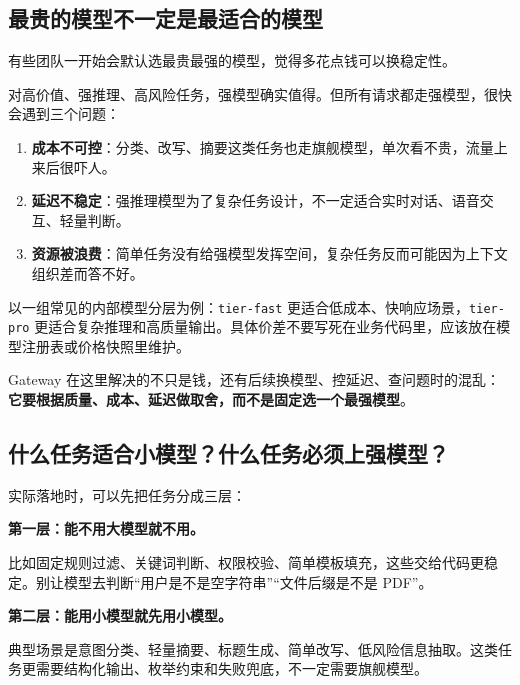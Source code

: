 \documentclass[10pt,a4paper]{ctexart}
\begin{document}
\subsection{最贵的模型不一定是最适合的模型}


有些团队一开始会默认选最贵最强的模型，觉得多花点钱可以换稳定性。



对高价值、强推理、高风险任务，强模型确实值得。但所有请求都走强模型，很快会遇到三个问题：


\begin{enumerate}[itemsep=2pt, topsep=4pt]
  \item \textbf{成本不可控}：分类、改写、摘要这类任务也走旗舰模型，单次看不贵，流量上来后很吓人。
  \item \textbf{延迟不稳定}：强推理模型为了复杂任务设计，不一定适合实时对话、语音交互、轻量判断。
  \item \textbf{资源被浪费}：简单任务没有给强模型发挥空间，复杂任务反而可能因为上下文组织差而答不好。
\end{enumerate}


以一组常见的内部模型分层为例：\texttt{tier-fast} 更适合低成本、快响应场景，\texttt{tier-pro} 更适合复杂推理和高质量输出。具体价差不要写死在业务代码里，应该放在模型注册表或价格快照里维护。



Gateway 在这里解决的不只是钱，还有后续换模型、控延迟、查问题时的混乱：\textbf{它要根据质量、成本、延迟做取舍，而不是固定选一个最强模型}。



\subsection{什么任务适合小模型？什么任务必须上强模型？}


实际落地时，可以先把任务分成三层：



\textbf{第一层：能不用大模型就不用。}



比如固定规则过滤、关键词判断、权限校验、简单模板填充，这些交给代码更稳定。别让模型去判断“用户是不是空字符串”“文件后缀是不是 PDF”。



\textbf{第二层：能用小模型就先用小模型。}



典型场景是意图分类、轻量摘要、标题生成、简单改写、低风险信息抽取。这类任务更需要结构化输出、枚举约束和失败兜底，不一定需要旗舰模型。
\end{document}

